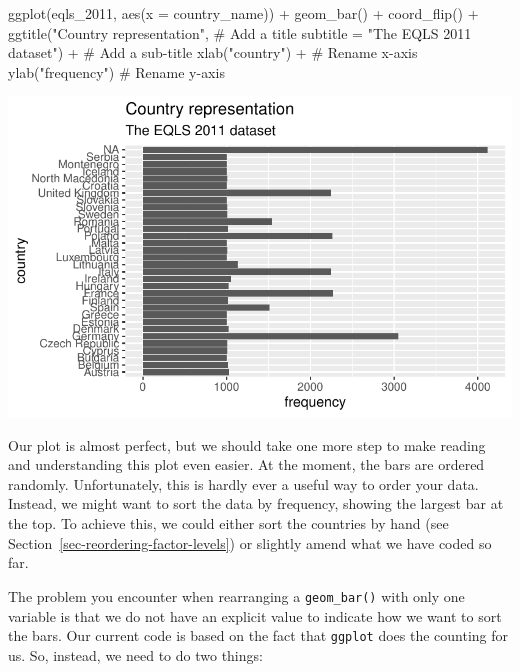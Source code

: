 \documentclass[
  letterpaper,
]{krantz}
\makeatletter
\newenvironment{Shaded}{\begin{snugshade}}{\end{snugshade}}
\newcommand{\AttributeTok}[1]{\textcolor[rgb]{0.40,0.45,0.13}{#1}}
\newcommand{\CommentTok}[1]{\textcolor[rgb]{0.37,0.37,0.37}{#1}}
\newcommand{\FunctionTok}[1]{\textcolor[rgb]{0.28,0.35,0.67}{#1}}
\newcommand{\NormalTok}[1]{\textcolor[rgb]{0.00,0.23,0.31}{#1}}
\newcommand{\SpecialCharTok}[1]{\textcolor[rgb]{0.37,0.37,0.37}{#1}}
\newcommand{\StringTok}[1]{\textcolor[rgb]{0.13,0.47,0.30}{#1}}
\newenvironment{kframe}{%
\medskip{}
\setlength{\fboxsep}{.8em}
 \def\at@end@of@kframe{}%
 \ifinner\ifhmode%
  \def\at@end@of@kframe{\end{minipage}}%
  \begin{minipage}{\columnwidth}%
 \fi\fi%
 \def\FrameCommand##1{\hskip\@totalleftmargin \hskip-\fboxsep
 \colorbox{shadecolor}{##1}\hskip-\fboxsep
     \hskip-\linewidth \hskip-\@totalleftmargin \hskip\columnwidth}%
 \MakeFramed {\advance\hsize-\width
   \@totalleftmargin\z@ \linewidth\hsize
   \@setminipage}}%
 {\par\unskip\endMakeFramed%
 \at@end@of@kframe}
\renewenvironment{Shaded}{\begin{kframe}}{\end{kframe}}
\makeatother
\begin{document}
\begin{Shaded}
\begin{Highlighting}[]
\FunctionTok{ggplot}\NormalTok{(eqls\_2011, }\FunctionTok{aes}\NormalTok{(}\AttributeTok{x =}\NormalTok{ country\_name)) }\SpecialCharTok{+}
  \FunctionTok{geom\_bar}\NormalTok{() }\SpecialCharTok{+}
  \FunctionTok{coord\_flip}\NormalTok{() }\SpecialCharTok{+}
  \FunctionTok{ggtitle}\NormalTok{(}\StringTok{"Country representation"}\NormalTok{,              }\CommentTok{\# Add a title}
          \AttributeTok{subtitle =} \StringTok{"The EQLS 2011 dataset"}\NormalTok{) }\SpecialCharTok{+}  \CommentTok{\# Add a sub{-}title}
  \FunctionTok{xlab}\NormalTok{(}\StringTok{"country"}\NormalTok{) }\SpecialCharTok{+}                          \CommentTok{\# Rename x{-}axis}
  \FunctionTok{ylab}\NormalTok{(}\StringTok{"frequency"}\NormalTok{)                              }\CommentTok{\# Rename y{-}axis}
\end{Highlighting}
\end{Shaded}

\includegraphics{08_descriptive_statistics_files/figure-pdf/country-barplot-extras-formatted-1.pdf}

Our plot is almost perfect, but we should take one more step to make
reading and understanding this plot even easier. At the moment, the bars
are ordered randomly. Unfortunately, this is hardly ever a useful way to
order your data. Instead, we might want to sort the data by frequency,
showing the largest bar at the top. To achieve this, we could either
sort the countries by hand (see
Section~\ref{sec-reordering-factor-levels}) or slightly amend what we
have coded so far.

The problem you encounter when rearranging a \texttt{geom\_bar()} with
only one variable is that we do not have an explicit value to indicate
how we want to sort the bars. Our current code is based on the fact that
\texttt{ggplot} does the counting for us. So, instead, we need to do two
things:
\end{document}
